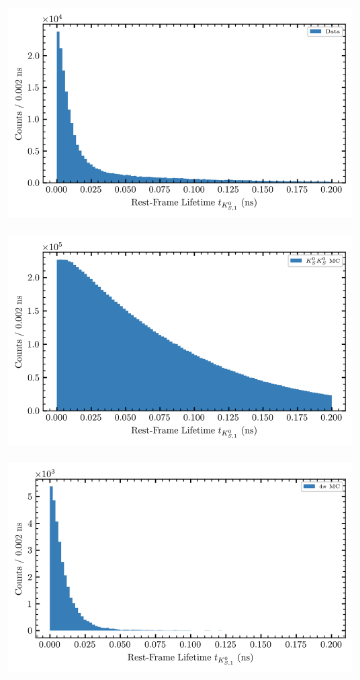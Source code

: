 \begin{figure}
  \begin{center}
    \begin{subfigure}[b]{.8\columnwidth}
      \includegraphics[width=1\linewidth]{figures/rfl_data_chisqdof_3.4.png}
      \caption{}
      \label{fig:rfl-data}
    \end{subfigure}
    \begin{subfigure}[b]{.8\columnwidth}
      \includegraphics[width=1\linewidth]{figures/rfl_accmc_chisqdof_3.4.png}
      \caption{}
      \label{fig:rfl-accmc}
    \end{subfigure}
    \begin{subfigure}[b]{.8\columnwidth}
      \includegraphics[width=1\linewidth]{figures/rfl_bkgmc_chisqdof_3.4.png}

\end{subfigure}
\end{center}
\end{figure}

